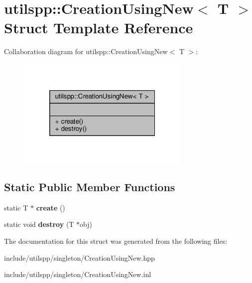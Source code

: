 \hypertarget{structutilspp_1_1CreationUsingNew}{\section{utilspp\-:\-:Creation\-Using\-New$<$ T $>$ Struct Template Reference}
\label{structutilspp_1_1CreationUsingNew}
}


Collaboration diagram for utilspp\-:\-:Creation\-Using\-New$<$ T $>$\-:
\nopagebreak
\begin{figure}[H]
\begin{center}
\leavevmode
\includegraphics[width=236pt]{structutilspp_1_1CreationUsingNew__coll__graph}
\end{center}
\end{figure}
\subsection*{Static Public Member Functions}
\begin{DoxyCompactItemize}
\item 
\hypertarget{structutilspp_1_1CreationUsingNew_a105f82c90ac834842f9a8d8f7e9890fd}{static T $\ast$ {\bfseries create} ()}\label{structutilspp_1_1CreationUsingNew_a105f82c90ac834842f9a8d8f7e9890fd}

\item 
\hypertarget{structutilspp_1_1CreationUsingNew_a808b9cb86569dcef4fa7d13bf0fbbea8}{static void {\bfseries destroy} (T $\ast$obj)}\label{structutilspp_1_1CreationUsingNew_a808b9cb86569dcef4fa7d13bf0fbbea8}

\end{DoxyCompactItemize}


The documentation for this struct was generated from the following files\-:\begin{DoxyCompactItemize}
\item 
include/utilspp/singleton/Creation\-Using\-New.\-hpp\item 
include/utilspp/singleton/Creation\-Using\-New.\-inl\end{DoxyCompactItemize}
